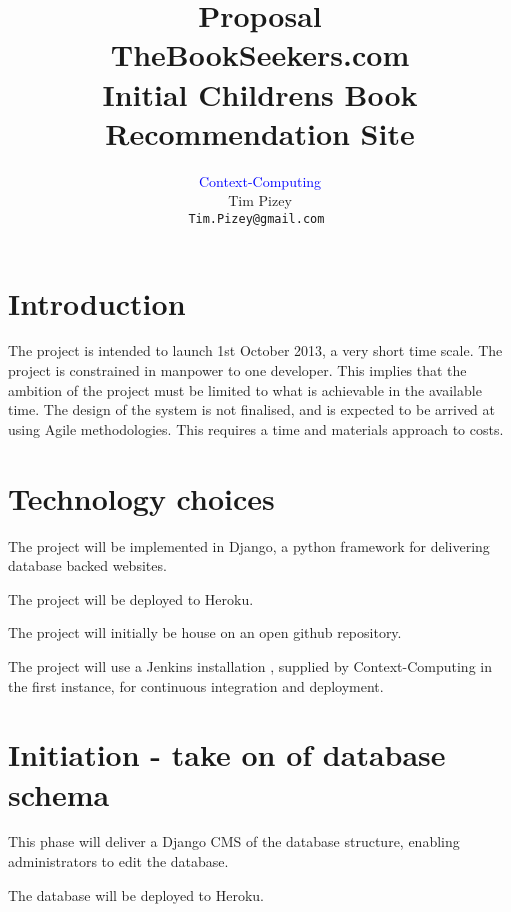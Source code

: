 \documentclass [12pt, a4paper, twoside, titlepage] {article}
\makeatletter
\newcommand{\context}{\sffamily \textcolor{blue}{\Large Context-Computing}}
\newcommand{\projectShortProperName}{TheBookSeekers.com}
\newcommand{\projectTitle}{Initial Childrens Book Recommendation Site}
\newcommand{\documentTypeTitle}{Proposal}
\newcommand{\authorName}{Tim Pizey}
\newcommand{\authorEmail}{Tim.Pizey@gmail.com}
\makeatother
\begin{document}
\sffamily
\allsectionsfont{\sffamily}


\title{
{\Huge \documentTypeTitle}
\\
\projectShortProperName 
\\ 
  {\small \projectTitle }
}

\author{
\context
\\\authorName
\\\tt{\authorEmail}
}
\date{} %
\maketitle
\clearpage
\newpage

\begingroup
\hypersetup{linkcolor=blue}
\tableofcontents
\endgroup
\newpage


\section{Introduction}
The project is intended to launch 1st October 2013, a very short time scale. The project is 
constrained in manpower to one developer. This implies that the ambition of the project must 
be limited to what is achievable in the available time.
The design of the system is not finalised, and is expected to be arrived at using Agile methodologies. This requires a time and materials approach to costs. 

\section{Technology choices}
The project will be implemented in Django, a python framework for delivering database backed websites. 

The project will be deployed to Heroku. 

The project will initially be house on an open github repository. 

The project will use a Jenkins installation \cite{jenkins.paneris.net}, supplied by Context-Computing in the first instance, 
for continuous integration and deployment.

\section{Initiation - take on of database schema}
This phase will deliver a Django CMS of the database structure, enabling administrators to edit the database. 

The database will be deployed to Heroku. 
\end{document}
